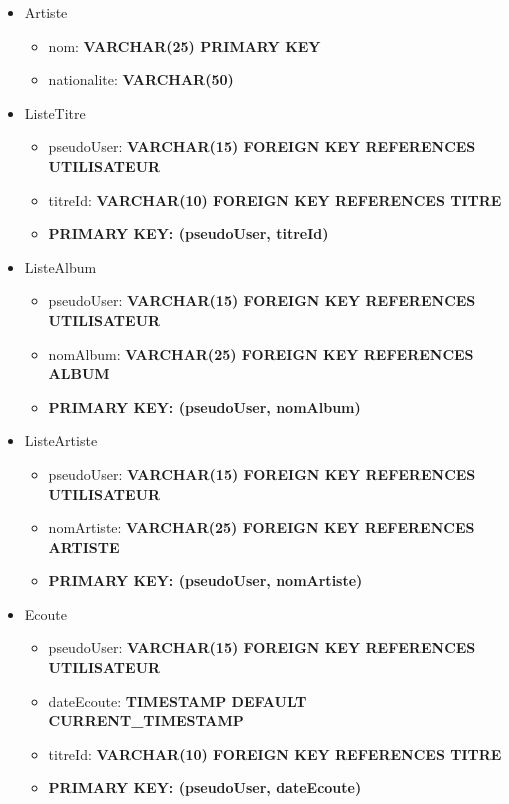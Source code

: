 \documentclass[a4paper,10pt, french]{report}
\begin{document}
\begin{itemize}
\begin{itemize}
        \end{itemize}
      \item Artiste
        \begin{itemize}
          \item nom: \textbf{VARCHAR(25) PRIMARY KEY}
          \item nationalite: \textbf{VARCHAR(50)}
        \end{itemize}
      \item ListeTitre
        \begin{itemize}
          \item pseudoUser: \textbf{VARCHAR(15) FOREIGN KEY REFERENCES UTILISATEUR}
          \item titreId: \textbf{VARCHAR(10) FOREIGN KEY REFERENCES TITRE}
          \item \textbf{PRIMARY KEY: (pseudoUser, titreId)}
        \end{itemize}
      \item ListeAlbum
        \begin{itemize}
          \item pseudoUser: \textbf{VARCHAR(15) FOREIGN KEY REFERENCES UTILISATEUR}
          \item nomAlbum: \textbf{VARCHAR(25) FOREIGN KEY REFERENCES ALBUM}
          \item \textbf{PRIMARY KEY: (pseudoUser, nomAlbum)}
        \end{itemize}
      \item ListeArtiste
        \begin{itemize}
          \item pseudoUser: \textbf{VARCHAR(15) FOREIGN KEY REFERENCES UTILISATEUR}
          \item nomArtiste: \textbf{VARCHAR(25) FOREIGN KEY REFERENCES ARTISTE}
          \item \textbf{PRIMARY KEY: (pseudoUser, nomArtiste)}
        \end{itemize}
      \item Ecoute
        \begin{itemize}
          \item pseudoUser: \textbf{VARCHAR(15) FOREIGN KEY REFERENCES UTILISATEUR}
          \item dateEcoute: \textbf{TIMESTAMP DEFAULT CURRENT\_TIMESTAMP}
          \item titreId: \textbf{VARCHAR(10) FOREIGN KEY REFERENCES TITRE}
          \item \textbf{PRIMARY KEY: (pseudoUser, dateEcoute)}

\end{itemize}
\end{itemize}
\end{document}
